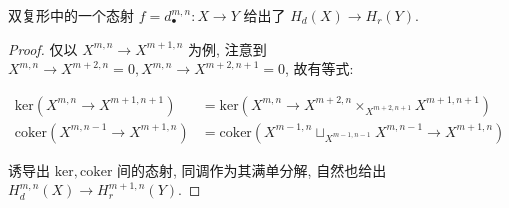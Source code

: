 \begin{lemma}
    双复形中的一个态射 \(f = d^{m,n}_{\bullet} : X \to Y\) 给出了 \(H_{d} (X) \to H_{r} (Y)\).

    \begin{proof}
        仅以 \(X^{m,n} \to X^{m+1,n}\) 为例, 注意到 \(X^{m,n} \to X^{m+2,n} = 0,X^{m,n} \to X^{m+2,n+1} = 0\), 故有等式:
        
        \[
            \begin{aligned}
                \mathrm{ker} (X^{m,n} \to X^{m+1,n+1}) &= \mathrm{ker} (X^{m,n} \to X^{m+2,n} \times_{X^{m+2,n+1}} X^{m+1,n+1}) \\
                \mathrm{coker} (X^{m,n-1} \to X^{m+1,n}) &= \mathrm{coker} (X^{m-1,n} \sqcup_{X^{m-1,n-1}} X^{m,n-1} \to X^{m+1,n})
            \end{aligned}
        \]

        诱导出 \(\mathrm{ker},\mathrm{coker}\) 间的态射, 同调作为其满单分解, 自然也给出 \(H_{d}^{m,n} (X) \to H_{r}^{m+1,n} (Y)\).
    \end{proof}
\end{lemma}

